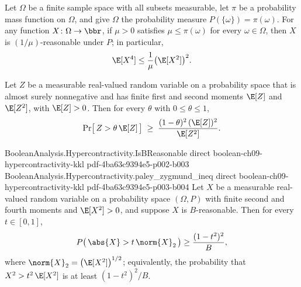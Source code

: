 \begin{lemma}
\label{BooleanAnalysis.Hypercontractivity.min_prob_b_reasonable}
\leanok
{}
Let $\Omega$ be a finite sample space with all subsets measurable, let $\pi$ be a
probability mass function on $\Omega$, and give $\Omega$ the probability measure
$P(\{\omega\})=\pi(\omega)$. For any function $X\colon\Omega\to\bbr$, if $\mu > 0$
satisfies $\mu \le \pi(\omega)$ for every $\omega \in \Omega$, then $X$ is
$(1/\mu)$-reasonable under $P$; in particular,
\[
\E[X^4] \le \frac{1}{\mu}\bigl(\E[X^2]\bigr)^2 .
\]
\end{lemma}

\begin{lemma}
\label{BooleanAnalysis.Hypercontractivity.paley_zygmund_ineq}
\leanok
{}
Let $Z$ be a measurable real-valued random variable on a probability space that is almost surely
nonnegative and has finite first and second moments $\E[Z]$ and $\E[Z^2]$, with $\E[Z] >
0$. Then for every $\theta$ with $0 \le \theta \le 1$,
\[
\Pr\bigl[\, Z > \theta\,\E[Z] \,\bigr] \;\ge\; \frac{(1-\theta)^2\,(\E[Z])^2}{\E[Z^2]}.
\]
\end{lemma}

\begin{lemma}
\label{BooleanAnalysis.Hypercontractivity.b_reasonable_anticon_zero}
\leanok
{}
\proofstep
  {BooleanAnalysis.Hypercontractivity.IsBReasonable}
  {direct}
  {boolean-ch09-hypercontractivity-kkl}
  {pdf-4ba63c9394e5-p002-b003}
\proofstep
  {BooleanAnalysis.Hypercontractivity.paley_zygmund_ineq}
  {direct}
  {boolean-ch09-hypercontractivity-kkl}
  {pdf-4ba63c9394e5-p003-b004}
Let $X$ be a measurable real-valued random variable on a probability space $(\Omega, P)$ with
finite second and fourth moments and $\E[X^2] > 0$, and suppose $X$ is $B$-reasonable.
Then for every $t \in [0,1]$,
\[
P\bigl(\,\abs{X} > t\,\norm{X}_2\,\bigr) \ge \frac{(1-t^2)^2}{B},
\]
where $\norm{X}_2 = \bigl(\E[X^2]\bigr)^{1/2}$; equivalently, the probability that $X^2
> t^2\,\E[X^2]$ is at least $(1-t^2)^2/B$.
\end{lemma}


